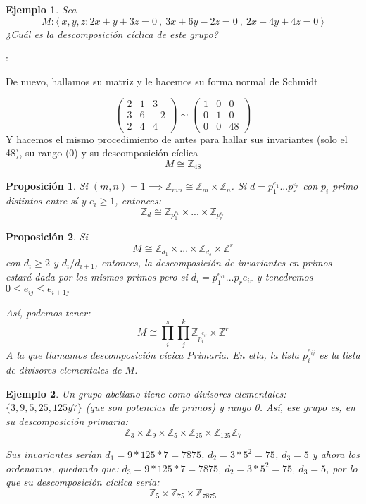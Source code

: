 \documentclass[11pt, a4paper, titlepage]{article}
\makeatletter
\renewenvironment{proof}[1][\proofname] {\vspace{-15pt}\par\pushQED{\qed}\normalfont\topsep6\p@\@plus6\p@\relax\trivlist\item[\hskip\labelsep\it#1\@addpunct{.}]\ignorespaces}{\popQED\endtrivlist\@endpefalse}
\providecommand{\ent}{\mathbb{Z}}
\theoremstyle{theorem-style}
\newtheorem*{nprop}{Proposición}
\theoremstyle{definition-style}
\theoremstyle{remark-style}
\theoremstyle{example-style}
\newtheorem*{ejemplo}{Ejemplo}
\makeatother
\begin{document}
\begin{ejemplo}
	Sea 
	\[
	M: \langle \ x,y,z :  2x+y+3z = 0  \ , \ 3x+6y-2z = 0 \ , \ 2x+4y+4z = 0 \ \rangle
	\]
	¿Cuál es la descomposición cíclica de este grupo?
\end{ejemplo}
\begin{proof}[Solución]:

De nuevo, hallamos su matriz y le hacemos su forma normal de Schmidt
	
\[
	\begin{pmatrix}
 2& 1  & 3 \\
 3 & 6 & -2 \\
 2 & 4 & 4 
\end{pmatrix}  \sim 	\begin{pmatrix}
 1 & 0 & 0 \\
 0 & 1 & 0 \\
 0 & 0 & 48 
\end{pmatrix} 
\]
Y hacemos el mismo procedimiento de antes para hallar sus invariantes (solo el 48), su rango (0) y su descomposición cíclica
\[
M \cong \ent_{48} 
\]

	
\end{proof}

\begin{nprop}
	Si $(m,n) = 1 \implies \ent_{mn} \cong \ent_m \times \ent_n$.
Si $d = p_1^{e_1}...p_r^{e_r}$ con $p_i$ primo distintos entre sí y $e_i \geq 1$, entonces:
\[
\ent_d \cong \ent_{p_1^{e_1}} \times ... \times \ent_{p_r^{e_r}}
\]
\end{nprop}

\begin{nprop}
	Si
	\[
	M \cong \ent_{d_1} \times ... \times \ent_{d_s} \times \ent^r
	\]
	con $d_i \geq 2 $ y $d_i / d_{i+1}$, entonces, la descomposición de invariantes en primos estará dada por los mismos primos pero si $d_i = p_1^{e_{i1}}...p_r{e_{ir}}$ y tenedremos $0 \leq e_{ij} \leq e_{i+1j}$
	
	Así, podemos tener:
	\[
	M \cong \prod_i^s \prod_j ^k \ent_{p_i^{e_{ij}}} \times \ent^r
	\]
	A la que llamamos descomposición cícica Primaria. En ella, la lista ${p_i^{e_{ij}}}$ es la lista de divisores elementales de $M$.
\end{nprop}
\begin{ejemplo}
	Un grupo abeliano tiene como divisores elementales: $\{3,9,5,25,125 y 7\} $ (que son potencias de primos) y rango 0. Así, ese grupo es, en su descomposición primaria:
	\[
	\ent_3 \times \ent_9 \times \ent_5 \times \ent_{25} \times \ent_{125} \ent_7
	\]
	
Sus invariantes serían $d_1 = 9*125*7 = 7875$, $d_2 = 3*5^2 = 75$, $d_3 = 5$ y ahora los ordenamos, quedando que: $d_3 = 9*125*7 = 7875$, $d_2 = 3*5^2 = 75$, $d_3 = 5$, por lo que su descomposición cíclica sería:
\[
\ent_5 \times \ent_{75} \times \ent_{7875}
\]
\end{ejemplo}
\end{document}
